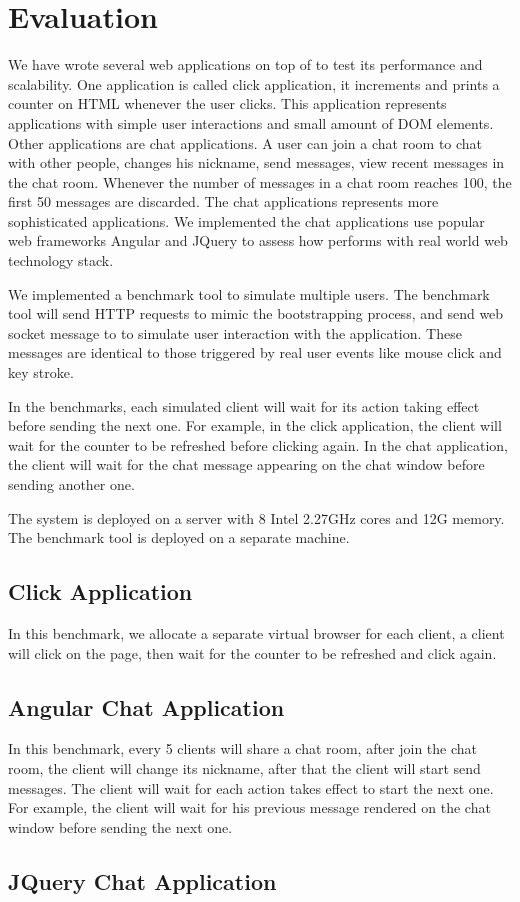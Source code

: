 \section{Evaluation}
\label{sec:eval}
We have wrote several web applications on top of \cb{} to test its
performance and scalability.
One application is called click application,
it increments and prints a counter on HTML whenever the user clicks.
This application represents applications with simple user interactions and small amount of DOM elements.
Other applications are chat applications.
A user can join a chat room to chat with other people,
changes his nickname, send messages, view recent messages in the chat room.
Whenever the number of messages in a chat room reaches 100, the first 50 messages
are discarded.
The chat applications represents more sophisticated applications.
We implemented the chat applications use popular web frameworks Angular and JQuery
to assess how \cb{} performs with real world web technology stack.

We implemented a benchmark tool to simulate multiple users.
The benchmark tool will send HTTP requests to mimic the bootstrapping process,
and send web socket message to \cb{} to simulate user interaction with the application.
These messages are identical to those triggered by real user events like mouse click and key stroke.

In the benchmarks, each simulated client will wait for its action taking effect before 
sending the next one.
For example, in the click application, the client will wait for the counter
to be refreshed before clicking again.
In the chat application, the client will wait for
the chat message appearing on the chat window before sending another one.

The \cb{} system is deployed on a server with 8 Intel 2.27GHz cores and 12G memory.
The benchmark tool is deployed on a separate machine.

\subsection{Click Application}
In this benchmark,
we allocate a separate virtual browser for each client,
a client will click on the page, then wait for the counter to be refreshed and click again.

\clickthroughput{}
\clicklatency{}

\clickwaitthroughput{}
\clickwaitlatency{}

\subsection{Angular Chat Application}
In this benchmark,
every 5 clients will share a chat room, 
after join the chat room, the client will change its nickname,
after that the client will start send messages.
The client will wait for each action takes effect to start the next one.
For example, the client will wait for his previous message rendered on the chat window before
sending the next one.

\angularchatlatency{}

\subsection{JQuery Chat Application}

\jquerychatlatency{}